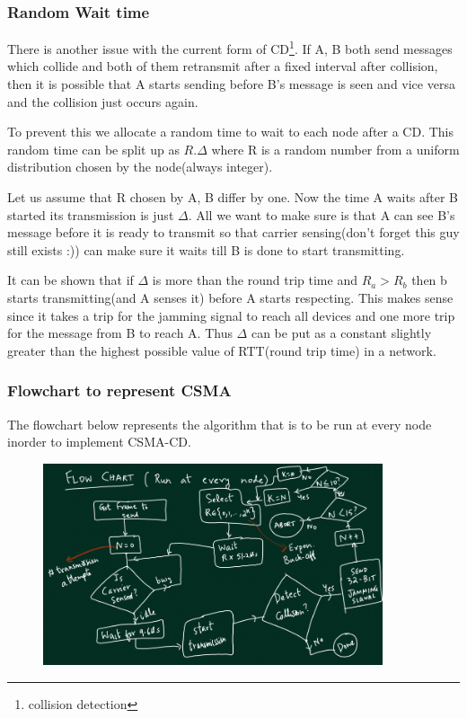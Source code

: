 \documentclass[12pt]{article}
\begin{document}
\subsubsection{Random Wait time}
There is another issue with the current form of CD\footnote{collision detection}. If A, B both send messages which 
collide and both of them retransmit after a fixed interval after collision, then it is possible that A starts
sending before B's message is seen and vice versa and the collision just occurs again. 

To prevent this we allocate a random time to wait to each node after a CD. This random time can be split up 
as \(R.\Delta\) where R is a random number from a uniform distribution chosen by the node(always integer). 

Let us assume that R chosen by A, B differ by one. Now the time A waits after B started its 
transmission is just \(\Delta\). All we want to make sure is that A can see B's message 
before it is ready to transmit so that carrier sensing(don't forget this guy still exists :)) can make sure it waits till B is done to start transmitting. 

It can be shown that if \(\Delta\) is more than the round trip time and \(R_a > R_b\) then b starts transmitting(and A senses it) before A starts respecting. 
This makes sense since it takes a trip for the jamming signal to reach all devices and one more trip for the message from B to reach A. Thus \(\Delta\) can be
put as a constant slightly greater than the highest possible value of RTT(round trip time) in a network. 

\subsubsection{Flowchart to represent CSMA}
The flowchart below represents the algorithm that is to be run at every node inorder to implement CSMA-CD. 
\begin{figure}[H]
    \centering
    \includegraphics*[width=10cm]{Diagrams/CSMA.png}
\end{figure}
\end{document}
